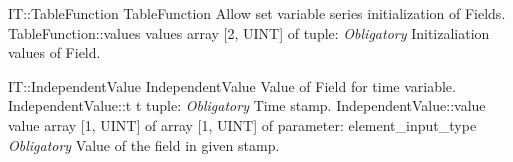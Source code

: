 \begin{RecordType}
	{IT::TableFunction}
	{TableFunction}
	{}%
	{}%
	{{{Allow set variable series initialization of Fields.}%
}}
		\RecKey
			{TableFunction::values}
			{values}
			{{array [2, UINT] of }{tuple: }}{}
			{ \it{Obligatory}}
			{{{Initizaliation values of Field.}%
}}
\end{RecordType}
\begin{TupleType}
	{IT::IndependentValue}
	{IndependentValue}
	{}%
	{}%
	{{{Value of Field for time variable.}%
}}
		\RecKey
			{IndependentValue::t}
			{t}
			{{tuple: }}{}
			{ \it{Obligatory}}
			{{{Time stamp.}%
}}
		\RecKey
			{IndependentValue::value}
			{value}
			{{array [1, UINT] of }{array [1, UINT] of }{parameter: element{\_}input{\_}type}}{}
			{ \it{Obligatory}}
			{{{Value of the field in given stamp.}%
}}
\end{TupleType}
